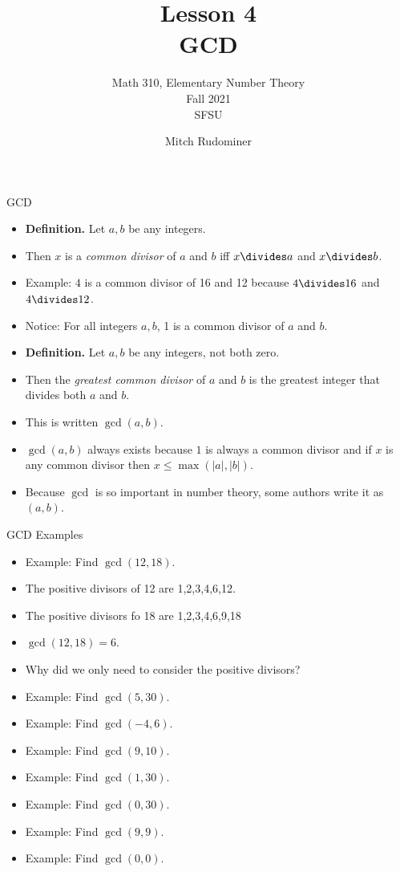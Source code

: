 \documentclass[handout]{beamer}
\title{Lesson 4 \\ GCD}
\subtitle{Math 310, Elementary Number Theory \\ Fall 2021 \\ SFSU}
\author{Mitch Rudominer}
\date{}
\begin{document}
\begin{frame}
  \titlepage
\end{frame}

\begin{frame}{GCD}

\begin{itemize}
  \item \textbf{Definition.} Let $a,b$ be any integers.
  \item Then $x$ is a \emph{common divisor} of $a$ and $b$ iff $x\divides a$ and $x\divides b$.
  \item Example: $4$ is a common divisor of 16 and 12 because $4\divides 16$ and $4\divides 12$.
  \item Notice: For all integers $a,b$, 1 is a common divisor of $a$ and $b$.
\end{itemize}

\begin{itemize}
  \item \textbf{Definition.} Let $a,b$ be any integers, not both zero.
  \item Then the \emph{greatest common divisor} of $a$ and $b$ is the greatest integer that divides both $a$ and $b$.
  \item This is written $\gcd(a,b)$.
  \item $\gcd(a,b)$ always exists because $1$ is always a common divisor and if $x$ is any common divisor then
  $x\leq\max(|a|,|b|)$.
  \item Because $\gcd$ is so important in number theory, some authors write it as $(a,b)$.
\end{itemize}

\end{frame}

\begin{frame}{GCD Examples}

\begin{itemize}
  \item Example: Find $\gcd(12,18)$.
  \item The positive divisors of 12 are 1,2,3,4,6,12.
  \item The positive divisors fo 18 are 1,2,3,4,6,9,18
  \item $\gcd(12,18) = 6$.
  \item Why did we only need to consider the positive divisors?
  \item Example: Find $\gcd(5, 30)$.
  \item Example: Find $\gcd(-4, 6)$.
  \item Example: Find $\gcd(9, 10)$.
  \item Example: Find $\gcd(1, 30)$.
  \item Example: Find $\gcd(0,30)$.
  \item Example: Find $\gcd(9,9)$.
  \item Example: Find $\gcd(0,0)$.
\end{itemize}

\end{frame}
\end{document}
